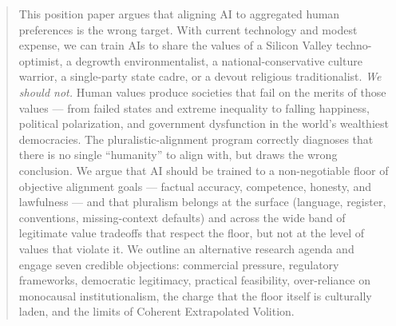 \documentclass{article}
\theoremstyle{plain}
\theoremstyle{definition}
\theoremstyle{remark}
\begin{document}

\printAffiliationsAndNotice{}  %

\begin{abstract}
  This position paper argues that aligning AI to aggregated human preferences is the wrong target. With current technology and modest expense, we can train AIs to share the values of a Silicon Valley techno-optimist, a degrowth environmentalist, a national-conservative culture warrior, a single-party state cadre, or a devout religious traditionalist. \emph{We should not.} Human values produce societies that fail on the merits of those values --- from failed states and extreme inequality to falling happiness, political polarization, and government dysfunction in the world's wealthiest democracies. The pluralistic-alignment program correctly diagnoses that there is no single ``humanity'' to align with, but draws the wrong conclusion. We argue that AI should be trained to a non-negotiable floor of objective alignment goals --- factual accuracy, competence, honesty, and lawfulness --- and that pluralism belongs at the surface (language, register, conventions, missing-context defaults) and across the wide band of legitimate value tradeoffs that respect the floor, but not at the level of values that violate it. We outline an alternative research agenda and engage seven credible objections: commercial pressure, regulatory frameworks, democratic legitimacy, practical feasibility, over-reliance on monocausal institutionalism, the charge that the floor itself is culturally laden, and the limits of Coherent Extrapolated Volition.
\end{abstract}
\end{document}
